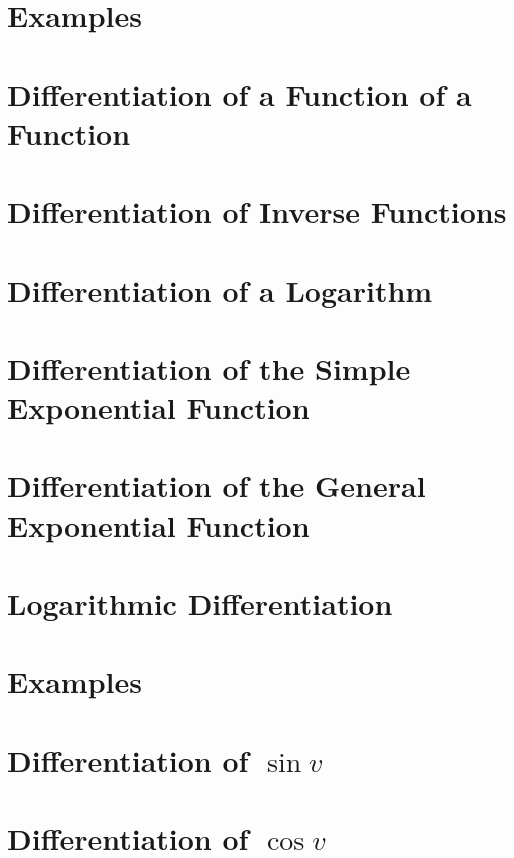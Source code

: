 \section{Examples}
\label{sec:05:10}

\section{Differentiation of a Function of a Function}
\label{sec:05:11}

\section{Differentiation of Inverse Functions}
\label{sec:05:12}

\section{Differentiation of a Logarithm}
\label{sec:05:13}

\section{Differentiation of the Simple Exponential Function}
\label{sec:05:14}

\section{Differentiation of the General Exponential Function}
\label{sec:05:15}

\section{Logarithmic Differentiation}
\label{sec:05:16}

\section{Examples}
\label{sec:05:17}

\section{Differentiation of $\sin v$}
\label{sec:05:18}

\section{Differentiation of $\cos v$}
\label{sec:05:19}

